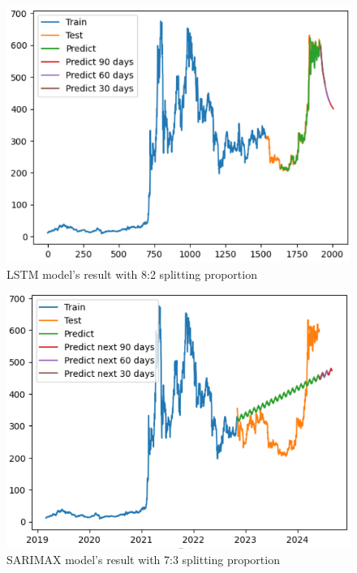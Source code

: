 \documentclass{ieeeojies}
\begin{document}
\begin{figure}[H]
	\centering
	\begin{minipage}{0.6\linewidth}
		\centering
		\includegraphics[width=\linewidth]{bibliography/Images/LSTM_BNB_82.PNG}
		\caption{LSTM model's result with 8:2 splitting proportion}
	\end{minipage}
\end{figure}
\begin{figure}[H]
	\centering
	\begin{minipage}{0.6\linewidth}
		\centering
		\includegraphics[width=\linewidth]{bibliography/Images/SARIMAX_BNB_73.PNG}
		\caption{SARIMAX model's result with 7:3 splitting proportion}
	\end{minipage}
\end{figure}
\end{document}
